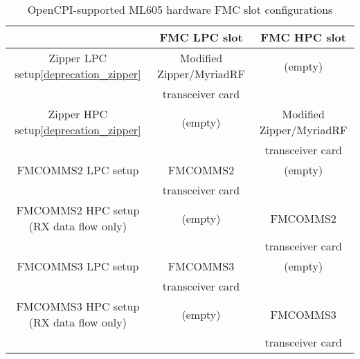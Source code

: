 \documentclass{article}
\begin{document}
\begin{center}
        \begin{table}[!htbp]
        \centering
        \caption{OpenCPI-supported ML605 hardware FMC slot configurations}
        \label{table:supported_slots}
        \begin{tabular}{|c|c|c|}
                \cline{2-3} \hline
                 & FMC LPC slot & FMC HPC slot \\ \hline
                \multicolumn{1}{|c|}{Zipper LPC setup\ref{deprecation_zipper}} & Modified\cite{zipper_mods} Zipper/MyriadRF & (empty)\\
                \multicolumn{1}{|c|}{ } & transceiver card & \\ \hline
                \multicolumn{1}{|c|}{Zipper HPC setup\ref{deprecation_zipper}} & (empty) & Modified\cite{zipper_mods} Zipper/MyriadRF \\
                \multicolumn{1}{|c|}{ } & & transceiver card \\ \hline
                \multicolumn{1}{|c|}{FMCOMMS2 LPC setup} & FMCOMMS2 & (empty)\\
                \multicolumn{1}{|c|}{ } & transceiver card & \\ \hline
                \multicolumn{1}{|c|}{FMCOMMS2 HPC setup (RX data flow only)} & (empty) & FMCOMMS2 \\
                \multicolumn{1}{|c|}{ } & & transceiver card \\ \hline
                \multicolumn{1}{|c|}{FMCOMMS3 LPC setup} & FMCOMMS3 & (empty)\\
                \multicolumn{1}{|c|}{ } & transceiver card & \\ \hline
                \multicolumn{1}{|c|}{FMCOMMS3 HPC setup (RX data flow only)} & (empty) & FMCOMMS3 \\
                \multicolumn{1}{|c|}{ } & & transceiver card \\ \hline
        \end{tabular}
        \end{table}




\end{center}
\end{document}

